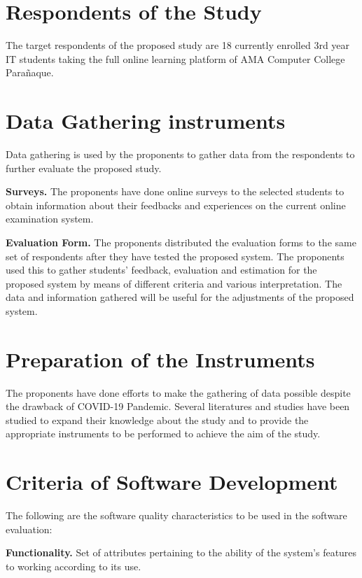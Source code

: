\section{Respondents of the Study}

The target respondents of the proposed study are 18 currently enrolled 3rd year IT students taking the full online learning platform of AMA Computer College Parañaque.

\section{Data Gathering instruments}

Data gathering is used by the proponents to gather data from the respondents to further evaluate the proposed study.

\textbf{Surveys.}
The proponents have done online surveys to the selected students to obtain information about their feedbacks and experiences on the current online examination system.

\textbf{Evaluation Form.}
The proponents distributed the evaluation forms to the same set of respondents after they have tested the proposed system.
The proponents used this to gather students' feedback, evaluation and estimation for the proposed system by means of different criteria and various interpretation.
The data and information gathered will be useful for the adjustments of the proposed system.

\section{Preparation of the Instruments}

The proponents have done efforts to make the gathering of data possible despite the drawback of COVID-19 Pandemic.
Several literatures and studies have been studied to expand their knowledge about the study and to provide the appropriate instruments to be performed to achieve the aim of the study.

\section{Criteria of Software Development}

The following are the software quality characteristics to be used in the software evaluation:

\textbf{Functionality.}
Set of attributes pertaining to the ability of the system's features to working according to its use.

